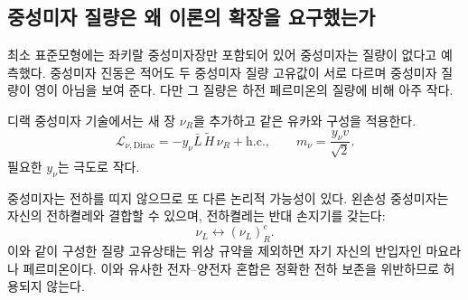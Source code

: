 \subsection{중성미자 질량은 왜 이론의 확장을 요구했는가}

최소 표준모형에는 좌키랄 중성미자장만 포함되어 있어 중성미자는 질량이 없다고 예측했다. 중성미자 진동은 적어도 두 중성미자 질량 고유값이 서로 다르며 중성미자 질량이 영이 아님을 보여 준다. 다만 그 질량은 하전 페르미온의 질량에 비해 아주 작다.

\begin{classroomqa}\end{classroomqa}

디랙 중성미자 기술에서는 새 장 \(\nu_R\)을 추가하고 같은 유카와 구성을 적용한다.
\begin{equation}
  \mathcal L_{\nu,\mathrm{Dirac}}
  =-y_\nu\bar L\,\widetilde H\,\nu_R+\mathrm{h.c.},
  \qquad
  m_\nu=\frac{y_\nu v}{\sqrt2}.
  \label{eq:l09-dirac-neutrino}
\end{equation}
필요한 \(y_\nu\)는 극도로 작다.

중성미자는 전하를 띠지 않으므로 또 다른 논리적 가능성이 있다. 왼손성 중성미자는 자신의 전하켤레와 결합할 수 있으며, 전하켤레는 반대 손지기를 갖는다:
\begin{equation}
  \nu_L\longleftrightarrow(\nu_L)^c_R .
  \label{eq:l09-majorana-mixing}
\end{equation}
이와 같이 구성한 질량 고유상태는 위상 규약을 제외하면 자기 자신의 반입자인 마요라나 페르미온이다. 이와 유사한 전자--양전자 혼합은 정확한 전하 보존을 위반하므로 허용되지 않는다.

\begin{classroomqa}
\end{classroomqa}

